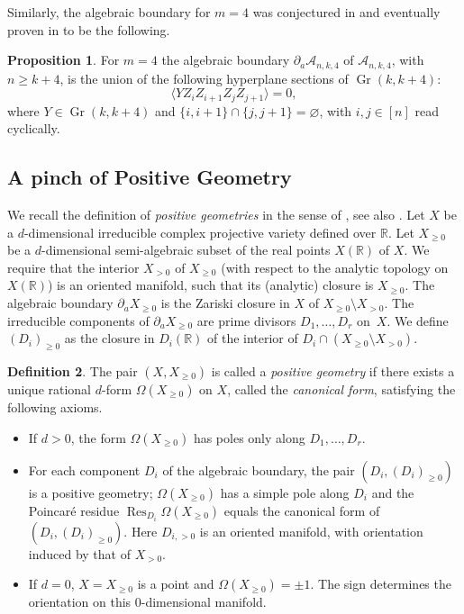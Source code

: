 \documentclass[12pt]{extarticle}
\theoremstyle{definition}
\newtheorem{definition}{Definition}[section]
\theoremstyle{theorem}
\newtheorem{proposition}[definition]{Proposition}
\theoremstyle{remark}
\numberwithin{equation}{section}
\DeclareMathOperator{\gr}{Gr}
\newcommand{\aA}{\mathcal{A}}
\begin{document}
Similarly, the algebraic boundary for $m=4$ was conjectured in \cite[Section 5]{arkani2018unwinding} and eventually proven in \cite[Corollary 8.8]{amplituhedronbcfwtriangulation} to be the following.
\begin{proposition}\label{prop:m=4_alg_boundary}
    For $m=4$ the algebraic boundary $\partial_a \aA_{n,k,4}$ of $\aA_{n,k,4}$, with $n \geq k+4$, is the union of the following
    hyperplane sections of $\gr(k,k+4)$:
    \[
    \langle YZ_i Z_{i+1} Z_j Z_{j+1}\rangle = 0,
    \]
    where $Y\in\gr(k,k+4)$ and $\{i,i+1\}\cap\{j,j+1\}=\varnothing$, with $i,j\in [n]$ read cyclically.
\end{proposition}

\subsection{A pinch of Positive Geometry}\label{sec:posGeom}

We recall the definition of \emph{positive geometries} in the sense of \cite{pos_geom_2017}, see also \cite{lam2024invitation}.
Let $X$ be a $d$-dimensional irreducible complex projective variety defined over $\mathbb{R}$. 
Let $X_{\geq 0}$ be a $d$-dimensional semi-algebraic subset of the real points $X(\mathbb{R})$ of $X$. 
We require that the interior $X_{>0}$ of $X_{\geq 0}$ (with respect to the analytic topology on $X(\mathbb{R})$) 
is an oriented manifold, such that its (analytic) closure is $X_{\geq 0}$. 
The algebraic boundary $\partial_a X_{\geq 0}$ is the Zariski closure in $X$ of $X_{\geq 0} \setminus X_{>0}$. 
The irreducible components of $\partial_a X_{\geq 0}$ are prime divisors $D_1,\ldots,D_r$ on~$X$. We define $(D_i)_{\geq 0}$ as the closure in $D_i(\mathbb{R})$ of the interior of $D_i \cap (X_{\geq 0}\setminus X_{>0})$.

\begin{definition}\label{def:pos_geom_lam}
The pair $(X, X_{\geq 0})$ is called a \emph{positive geometry} if there exists a unique rational $d$-form $\Omega(X_{\geq 0})$ on $X$, called the \emph{canonical form}, satisfying the following axioms.
\begin{itemize}
    \item If $d > 0$, the form $\Omega(X_{\geq 0})$ has poles only along $D_1,\ldots,D_r$. 
    \item For each component $D_i$ of the algebraic boundary, the pair $(D_i,(D_i)_{\geq 0})$ is a positive geometry; $\Omega(X_{\geq 0})$ has a simple pole along $D_i$ 
    and the Poincaré residue $\operatorname{Res}_{D_i} \Omega(X_{\geq 0})$ equals the canonical form of 
    $(D_i,(D_i)_{\geq 0})$. Here $D_{i,> 0}$ is an oriented manifold, 
    with orientation induced by that of $X_{>0}$. 
    \item If $d=0$, $X=X_{\geq 0}$ is a point and $\Omega(X_{\geq 0}) = \pm 1$. 
    The sign determines the orientation on this 0-dimensional manifold.
\end{itemize}
\end{definition}
\end{document}
